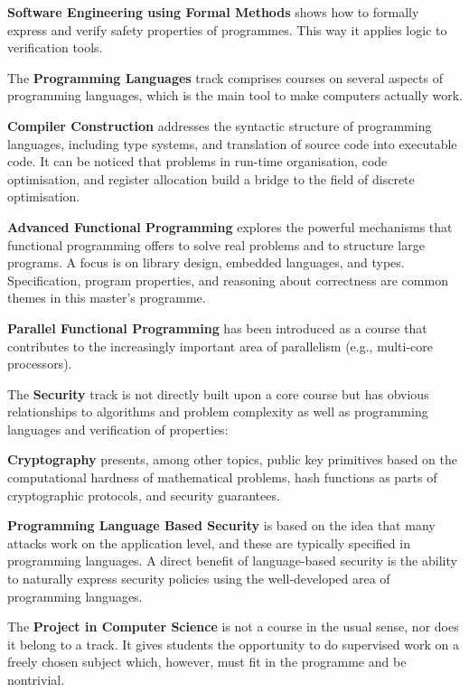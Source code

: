 \documentclass[twocolumn]{article}
\begin{document}
{\bf Software Engineering using Formal Methods} shows how to formally
express and verify safety properties of programmes. This way it
applies logic to verification tools.

\bigskip
%
The {\bf Programming Languages} track comprises courses on several
aspects of programming languages, which is the main tool to make
computers actually work.

{\bf Compiler Construction} addresses the syntactic structure of
programming languages, including type systems, and translation of
source code into executable code. It can be noticed that problems in
run-time organisation, code optimisation, and register allocation
build a bridge to the field of discrete optimisation.

{\bf Advanced Functional Programming} explores the powerful mechanisms
that functional programming offers to solve real problems and to
structure large programs. A focus is on library design, embedded
languages, and types.  Specification, program properties, and
reasoning about correctness are common themes in this master's
programme.

{\bf Parallel Functional Programming} has been introduced as a course
that contributes to the increasingly important area of parallelism
(e.g., multi-core processors).

\bigskip
%
The {\bf Security} track is not directly built upon a core course but
has obvious relationships to algorithms and problem complexity as well
as programming languages and verification of properties:

{\bf Cryptography} presents, among other topics, public key primitives
based on the computational hardness of mathematical problems, hash
functions as parts of cryptographic protocols, and security
guarantees.

{\bf Programming Language Based Security} is based on the idea that
many attacks work on the application level, and these are typically
specified in programming languages. A direct benefit of language-based
security is the ability to naturally express security policies using
the well-developed area of programming languages.

\bigskip
%
The {\bf Project in Computer Science} is not a course in the usual
sense, nor does it belong to a track. It gives students the
opportunity to do supervised work on a freely chosen subject which,
however, must fit in the programme and be nontrivial.
\end{document}
